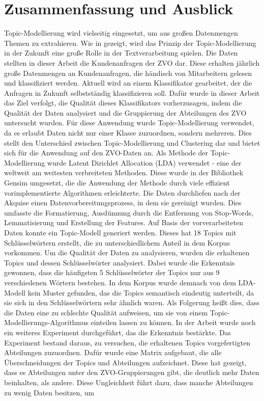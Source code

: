 \documentclass[german,version-2020-11]{uzl-thesis}
\begin{document}
\chapter{Zusammenfassung und Ausblick}%

Topic-Modellierung wird vielseitig eingesetzt, um aus großen Datenmengen Themen zu extrahieren. Wie in \cite{ptm} gezeigt, wird das Prinzip der Topic-Modellierung in der Zukunft eine große Rolle in der Textverarbeitung spielen. Die Daten stellten in dieser Arbeit die Kundenanfragen der ZVO dar. Diese erhalten jährlich große Datenmengen an Kundenanfragen, die händisch von Mitarbeitern gelesen und klassifiziert werden. Aktuell wird an einem Klassifikator gearbeitet, der die Anfragen in Zukunft selbstständig klassifizieren soll. Dafür wurde in dieser Arbeit das Ziel verfolgt, die Qualität dieses Klassifikators vorherzusagen, indem die Qualität der Daten analysiert und die Gruppierung der Abteilungen des ZVO untersucht wurden. Für diese Anwendung wurde Topic-Modellierung verwendet, da es erlaubt Daten nicht nur einer Klasse zuzuordnen, sondern mehreren. Dies stellt den Unterschied zwischen Topic-Modellierung und Clustering dar und bietet sich für die Anwendung auf den ZVO-Daten an. Als Methode der Topic-Modellierung wurde Latent Dirichlet Allocation (LDA) verwendet - eine der weltweit am weitesten verbreiteten Methoden. Diese wurde in der Bibliothek Gensim umgesetzt, die die Anwendung der Methode durch viele effizient vorimplementierte Algorithmen erleichterte. Die Daten durchliefen nach der Akquise einen Datenvorbereitungsprozess, in dem sie gereinigt wurden. Dies umfasste die Formatierung, Ausdünnung durch die Entfernung von Stop-Words, Lemmatisierung und Erstellung der Features. Auf Basis der vorverarbeiteten Daten konnte ein Topic-Modell generiert werden. Dieses hat 18 Topics mit Schlüsselwörtern erstellt, die zu unterschiedlichem Anteil in dem Korpus vorkommen. Um die Qualität der Daten zu analysieren, wurden die erhaltenen Topics und dessen Schlüsselwörter analysiert. Dabei wurde die Erkenntnis gewonnen, dass die häufigsten 5 Schlüsselwörter der Topics nur aus 9 verschiedenen Wörtern bestehen. In dem Korpus wurde demnach von dem LDA-Modell kein Muster gefunden, das die Topics semantisch eindeutig unterteilt, da sie sich in den Schlüsselwörtern sehr ähnlich waren. Als Folgerung heißt dies, dass die Daten eine zu schlechte Qualität aufweisen, um sie von einem Topic-Modellierungs-Algorithmus einteilen lassen zu können. In der Arbeit wurde noch ein weiteres Experiment durchgeführt, das die Erkenntnis bestärkte. Das Experiment bestand daraus, zu versuchen, die erhaltenen Topics vorgefertigten Abteilungen zuzuordnen. Dafür wurde eine Matrix aufgebaut, die alle Überschneidungen der Topics und Abteilungen aufzeichnet. Diese hat gezeigt, dass es Abteilungen unter den ZVO-Gruppierungen gibt, die deutlich mehr Daten beinhalten, als  andere. Diese Ungleichheit führt dazu, dass manche Abteilungen zu wenig Daten besitzen, um 
\end{document}
